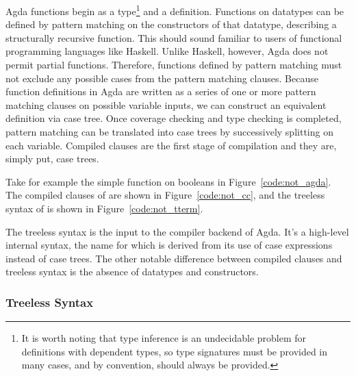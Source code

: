Agda functions begin as a type\footnote{It is worth noting that type inference is an undecidable problem for definitions with dependent types, so type signatures must be provided in many cases, and by convention, should always be provided.} and a definition. Functions on datatypes can be defined by pattern matching on the constructors of that datatype, describing a structurally recursive function.\citep{agdawiki} %
This should sound familiar to users of functional programming languages like Haskell. Unlike Haskell, however, Agda does not permit partial functions. Therefore, functions defined by pattern matching must not exclude any possible cases from the pattern matching clauses.\citep{agdawiki} %
Because function definitions in Agda are written as a series of one or more pattern matching clauses on possible variable inputs, we can construct an equivalent definition via case tree.\citep{agdawiki} %
Once coverage checking and type checking is completed, pattern matching can be translated into case trees by successively splitting on each variable.\citep{agdahackage} %
Compiled clauses are the first stage of compilation and they are, simply put, case trees.

Take for example the simple  function on booleans in Figure~\ref{code:not_agda}. The compiled clauses of  are shown in Figure~\ref{code:not_cc}, and the treeless syntax of  is shown in Figure~\ref{code:not_tterm}.



The treeless syntax is the input to the compiler backend of Agda. It's a high-level internal syntax, the name for which is derived from its use of case expressions instead of case trees. The other notable difference between compiled clauses and treeless syntax is the absence of datatypes and constructors.\citep{agdahackage} %

\subsubsection{Treeless Syntax}


